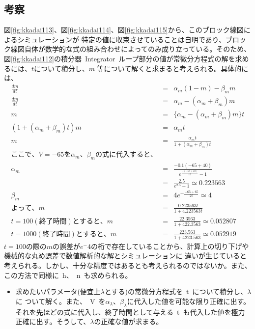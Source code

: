\documentclass[10pt]{jarticle}
\begin{document}
\clearpage
\subsection{考察}
%
図\ref{fig:kkadai113}、図\ref{fig:kkadai114}、図\ref{fig:kkadai115}から、このブロック線図によるシミュレーションが
特定の値に収束させていることは自明であり、ブロック線図自体が数学的な式の組み合わせによってのみ成り立っている。そのため、
図\ref{fig:kkadai112}の積分器\ Integrator\ ループ部分の値が常微分方程式の解を求めるには、$ t $について積分し、$ m $
等について解くと求まると考えられる。具体的には、
\begin{eqnarray}
	\frac{dm}{dt} &=& \alpha_{m} (1 - m) - \beta_{m} m \\
	\frac{dm}{dt} &=& \alpha_{m} - (\alpha_{m} + \beta_{m}) m \\
	m &=& \{\alpha_{m} - (\alpha_{m} + \beta_{m}) m \} t \\ 
	(1 + (\alpha_{m} + \beta_{m}) t ) m &=& \alpha_{m} t \\
	m &=& \frac{\alpha_{m} t}{1 + (\alpha_{m} + \beta_{m}) t } \\ 
	ここで、V = -65 を \alpha_{m}、\beta_{m} の式に代入すると、\\
	\alpha_{m} &=& \frac{-0.1 (-65 + 40)}{e^{\frac{- (-65 + 40)}{10}} - 1} \\
	&=& \frac{2.5}{e^{2.5} - 1} \simeq 0.223563 \\
	\beta_{m} &=& 4 e^{- \frac{-65 + 65}{20}} \simeq 4 \\
	よって、 m &=& \frac{0.223563t}{1 + 4.223563t} \\
	t = 100(終了時間)とすると、m &=& \frac{22.3563}{1 + 422.3563} \simeq 0.052807 \\
	t = 1000(終了時間)とすると、m &=& \frac{223.563}{1 + 4223.563} \simeq 0.052919
\end{eqnarray}
$ t = 100 $の際の$ m $の誤差が$ e^-4 $の桁で存在していることから、計算上の切り下げや機械的な丸め誤差で数値解析的な解とシミュレーションに
違いが生じていると考えられる。しかし、十分な精度ではあるとも考えられるのではないか。また、この方法で同様に\ h、\ n\ も求められる。
\begin{itemize}
	\setlength{\leftskip}{5.5cm}
	\item[● 初期値を理論的に求める方法] 求めたいパラメータ(便宜上$ \lambda $とする)の常微分方程式を\ t\ について積分し、$ \lambda $に
		ついて解く。また、\ V\ を$ \alpha_{\lambda}、\beta_{\lambda} $に代入した値を可能な限り正確に出す。
		それを先ほどの式に代入し、終了時間として与える\ t\ も代入した値を極力正確に出す。そうして、$ \lambda $の正確な値が求まる。
\end{itemize}
%
\end{document}

